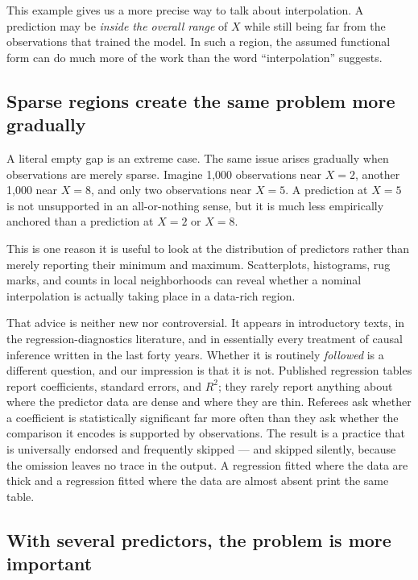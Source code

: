 \documentclass[11pt]{report}
\begin{document}
This example gives us a more precise way to talk about interpolation. A prediction may be \emph{inside the overall range} of \(X\) while still being far from the observations that trained the model. In such a region, the assumed functional form can do much more of the work than the word ``interpolation'' suggests.

\subsection{Sparse regions create the same problem more gradually}

A literal empty gap is an extreme case. The same issue arises gradually when observations are merely sparse. Imagine 1,000 observations near \(X=2\), another 1,000 near \(X=8\), and only two observations near \(X=5\). A prediction at \(X=5\) is not unsupported in an all-or-nothing sense, but it is much less empirically anchored than a prediction at \(X=2\) or \(X=8\).

This is one reason it is useful to look at the distribution of predictors rather than merely reporting their minimum and maximum. Scatterplots, histograms, rug marks, and counts in local neighborhoods can reveal whether a nominal interpolation is actually taking place in a data-rich region.

That advice is neither new nor controversial. It appears in introductory texts, in the regression-diagnostics literature, and in essentially every treatment of causal inference written in the last forty years. Whether it is routinely \emph{followed} is a different question, and our impression is that it is not. Published regression tables report coefficients, standard errors, and \(R^2\); they rarely report anything about where the predictor data are dense and where they are thin. Referees ask whether a coefficient is statistically significant far more often than they ask whether the comparison it encodes is supported by observations. The result is a practice that is universally endorsed and frequently skipped --- and skipped silently, because the omission leaves no trace in the output. A regression fitted where the data are thick and a regression fitted where the data are almost absent print the same table.


\subsection{With several predictors, the problem is more important}
\end{document}
